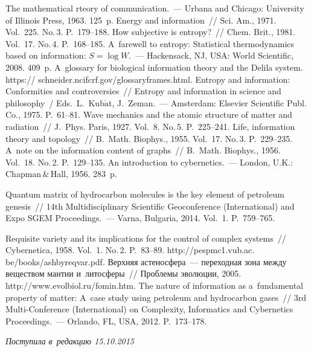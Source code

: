 \begin{multicols}{2}
{{\begin{thebibliography}{99}
 The mathematical rteory of communication.~--- Urbana and 
Chicago: University of Illinois Press, 1963. 125~p.
 Energy and information~// Sci. Am., 1971. 
Vol.~225. No.\,3. P.~179--188.
 How subjective is entropy?~// Chem. Brit., 1981. Vol.~17. No.\,4. 
P.~168--185.
 A~farewell to entropy: Statistical thermodynamics based on 
information: $S=\log W$.~---  Hackensack, NJ, USA: World Scientific, 2008. 409~p.
 A~glossary for biological information theory and the Delila 
system. {\sf https:// schneider.ncifcrf.gov/glossaryframes.html}. 
 Entropy and information: Conformities and controversies~// Entropy and 
information in science and philosophy~/ Eds.\ L.~Kub$\acute{\mbox{a}}$t, J.~Zeman.~--- 
Amsterdam: Elsevier Scientific Publ. Co., 1975. P.~61--81.
 Wave mechanics and the atomic structure of matter and radiation~// 
J.~Phys. Paris, 1927. Vol.~8. No.\,5. P.~225--241.
 Life, information theory and topology~// B.~Math. 
Biophys., 1955. Vol.~17. No.\,3. P.~229--235. 
 A~note on the information content of graphs~// B.~Math. 
Biophys., 1956. Vol.~18. No.\,2. P.~129--135. 
An introduction to cybernetics.~--- London, U.K.: Chapman\,\&\,Hall, 
1956. 283~p.

\pagebreak

 Quantum matrix of hydrocarbon molecules is the key 
element of petroleum genesis~// 14th Multidisciplinary Scientific Geoconference 
(International) and Expo SGEM Proceedings.~--- Varna, Bulgaria, 2014. Vol.~1. P.~759--765.


 Requisite variety and its implications for the control of complex 
systems~// Cybernetica, 1958. Vol.~1. No.\,2. P.~83--89. {\sf 
http://pespmc1.vub.ac. be/books/ashbyreqvar.pdf}. 
 Верхняя астеносфера~--- переходная зона между веществом 
мантии и~литосферы~// Проблемы эволюции, 2005. {\sf http://www.evolbiol.ru/fomin.htm}.
 The nature of information as a~fundamental 
property of matter: A~case study using petroleum and hydrocarbon gases~// 
3rd Multi-Conference (International) on Complexity, Informatics 
and Cybernetics Proceedings.~--- Orlando, FL, USA, 2012. P.~173--178.

\end{thebibliography}
} }

\end{multicols}

 \label{end\stat}

 \vspace*{-3pt}

\hfill{\small\textit{Поступила в~редакцию  15.10.2015}}
\renewcommand{\figurename}{\protect\bf Рис.}
\renewcommand{\tablename}{\protect\bf Таблица} 
 
 